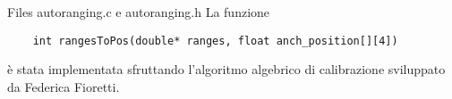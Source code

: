 \begin{frame}[fragile]{Files autoranging.c e autoranging.h}
  La funzione
  \begin{lstlisting}
    int rangesToPos(double* ranges, float anch_position[][4])
  \end{lstlisting}
  è stata implementata sfruttando l'algoritmo algebrico di calibrazione sviluppato da Federica Fioretti.
\end{frame}
